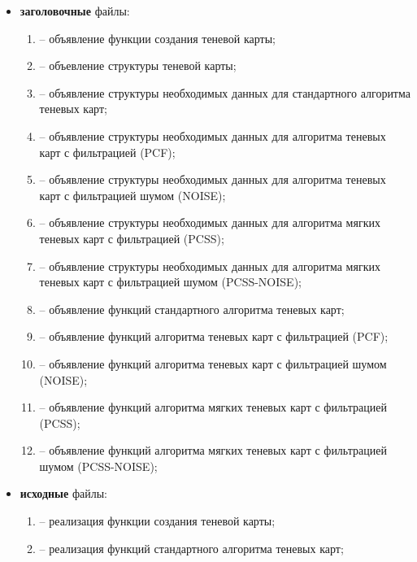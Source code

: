 \begin{itemize}[label=---]
    \item \textbf{заголовочные} файлы:
    \begin{enumerate}[label=\arabic*), labelsep=0.5em]
        \item {} -- объявление функции создания теневой карты;
        \item {} -- объевление структуры теневой карты;
        \item {} -- объявление структуры необходимых данных для
        стандартного алгоритма теневых карт;
        \item {} -- объявление структуры необходимых данных для
        алгоритма теневых карт с фильтрацией (PCF);
        \item {} -- объявление структуры необходимых данных для
        алгоритма теневых карт с фильтрацией шумом (NOISE);
        \item {} -- объявление структуры необходимых данных для
        алгоритма мягких теневых карт с фильтрацией (PCSS);
        \item {} -- объявление структуры необходимых данных для
        алгоритма мягких теневых карт с фильтрацией шумом (PCSS-NOISE);
        \item {} -- объявление функций стандартного алгоритма теневых карт;
        \item {} -- объявление функций алгоритма теневых карт с фильтрацией (PCF);
        \item {} -- объявление функций алгоритма теневых карт с фильтрацией шумом (NOISE);
        \item {} -- объявление функций алгоритма мягких теневых карт с фильтрацией (PCSS);
        \item {} -- объявление функций алгоритма мягких теневых карт с фильтрацией шумом (PCSS-NOISE);
    \end{enumerate}
    \item \textbf{исходные} файлы:
    \begin{enumerate}[label=\arabic*), labelsep=0.5em]
        \item {} -- реализация функции создания теневой карты;
        \item {} -- реализация функций стандартного алгоритма теневых карт;

\end{enumerate}
\end{itemize}
